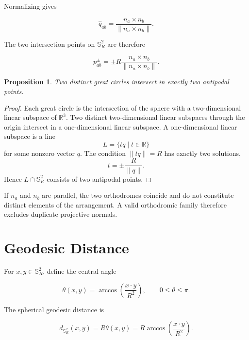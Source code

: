 \documentclass[11pt,fleqn]{book}
\numberwithin{equation}{chapter}
\theoremstyle{plain}
\newtheorem{proposition}[theorem]{Proposition}
\theoremstyle{definition}
\theoremstyle{remark}
\newcommand{\Sphere}{\mathbb{S}^{2}}
\newcommand{\R}{\mathbb{R}}
\begin{document}
Normalizing gives

\begin{equation}
    \widehat q_{ab}
    =
    \frac{n_a\times n_b}
         {\|n_a\times n_b\|}.
\end{equation}

The two intersection points on \(\Sphere_R\) are therefore

\begin{equation}
    p_{ab}^{\pm}
    =
    \pm R
    \frac{n_a\times n_b}
         {\|n_a\times n_b\|}.
\end{equation}

\begin{proposition}
Two distinct great circles intersect in exactly two antipodal points.
\end{proposition}

\begin{proof}
Each great circle is the intersection of the sphere with a two-dimensional linear subspace of \(\R^3\). Two distinct two-dimensional linear subspaces through the origin intersect in a one-dimensional linear subspace. A one-dimensional linear subspace is a line
\[
L=\{tq\mid t\in\R\}
\]
for some nonzero vector \(q\). The condition \(\|tq\|=R\) has exactly two solutions,
\[
t=\pm\frac{R}{\|q\|}.
\]
Hence \(L\cap\Sphere_R\) consists of two antipodal points.
\end{proof}

If \(n_a\) and \(n_b\) are parallel, the two orthodromes coincide and do not constitute distinct elements of the arrangement. A valid orthodromic family therefore excludes duplicate projective normals.

\section{Geodesic Distance}

For \(x,y\in\Sphere_R\), define the central angle

\begin{equation}
    \theta(x,y)
    =
    \arccos\left(
      \frac{x\cdot y}{R^2}
    \right),
    \qquad
    0\leq\theta\leq\pi.
\end{equation}

The spherical geodesic distance is

\begin{equation}
    d_{\Sphere_R}(x,y)
    =
    R\theta(x,y)
    =
    R\arccos\left(
      \frac{x\cdot y}{R^2}
    \right).
\end{equation}
\end{document}
